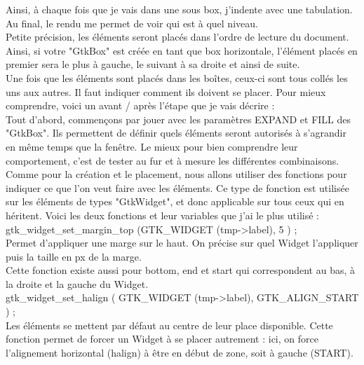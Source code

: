 \documentclass[11pt,french,a4paper]{report}
\begin{document}
Ainsi, à chaque fois que je vais dans une sous box, j'indente avec une tabulation. Au final, le rendu me permet de voir qui est
à quel niveau. \\
Petite précision, les éléments seront placés dans l'ordre de lecture du document. Ainsi, si votre "GtkBox" est créée en tant
que box horizontale, l'élément placés en premier sera le plus à gauche, le suivant à sa droite et ainsi de suite. \\ 


Une fois que les éléments sont placés dans les boîtes, ceux-ci sont tous collés les uns aux autres. Il faut indiquer 
comment ils doivent se placer. Pour mieux comprendre, voici un avant / après l'étape que je vais décrire : \\ 


Tout d'abord, commençons par jouer avec les paramètres EXPAND et FILL des "GtkBox". Ils permettent de définir quels éléments seront 
autorisés à s'agrandir en même temps que la fenêtre. Le mieux pour bien comprendre leur comportement, c'est de tester au fur
et à mesure les différentes combinaisons. \\

Comme pour la création et le placement, nous allons utiliser des fonctions pour indiquer ce que l'on veut faire avec les éléments.
Ce type de fonction est utilisée sur les éléments de types "GtkWidget", et donc applicable sur tous ceux qui en héritent. Voici les
deux fonctions et leur variables que j'ai le plus utilisé : \\


 gtk\_widget\_set\_margin\_top (GTK\_WIDGET (tmp->label), 5 ) ; \\
Permet d'appliquer une marge sur le haut. On précise sur quel Widget l'appliquer puis la taille en px de la marge.\\
Cette fonction existe aussi pour bottom, end et start qui correspondent au bas, à la droite et la gauche du Widget.\\

 gtk\_widget\_set\_halign ( GTK\_WIDGET (tmp->label), GTK\_ALIGN\_START ) ;\\
Les éléments se mettent par défaut au centre de leur place disponible. Cette fonction permet 
de forcer un Widget à se placer autrement : ici, on force l'alignement horizontal (halign) à être en début de zone, 
soit à gauche (START). \\
\end{document}
